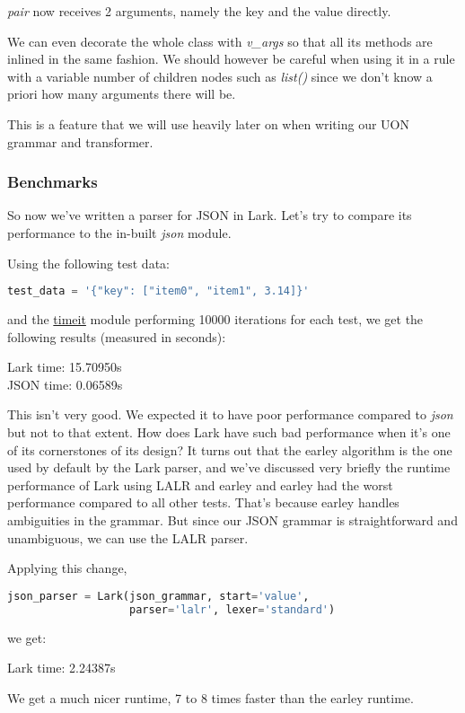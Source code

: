 \documentclass[12pt]{article}
\begin{document}
\emph{pair} now receives 2 arguments, namely the key and the value directly.

We can even decorate the whole class with \emph{v\_args} so that all its methods are inlined in the same fashion. We should however be careful when using it in a rule with a variable number of children nodes such as \emph{list()} since we don't know a priori how many arguments there will be.

This is a feature that we will use heavily later on when writing our UON grammar and transformer.

\subsubsection{Benchmarks}
So now we've written a parser for JSON in Lark. Let's try to compare its performance to the in-built \emph{json} module.

Using the following test data:
\begin{lstlisting}[language=Python]
test_data = '{"key": ["item0", "item1", 3.14]}'
\end{lstlisting}

and the \href{https://docs.python.org/3/library/timeit.html}{timeit} module performing 10000 iterations for each test, we get the following results (measured in seconds):

Lark time:  15.70950s \\
JSON time:  0.06589s

This isn't very good. We expected it to have poor performance compared to \emph{json} but not to that extent. How does Lark have such bad performance when it's one of its cornerstones of its design? It turns out that the earley algorithm is the one used by default by the Lark parser, and we've discussed very briefly the runtime performance of Lark using LALR and earley and earley had the worst performance compared to all other tests. That's because earley handles ambiguities in the grammar. But since our JSON grammar is straightforward and unambiguous, we can use the LALR parser.

Applying this change,
\begin{lstlisting}[language=Python]
json_parser = Lark(json_grammar, start='value',
                   parser='lalr', lexer='standard')
\end{lstlisting}
we get:

Lark time:  2.24387s

We get a much nicer runtime, 7 to 8 times faster than the earley runtime.
\end{document}

